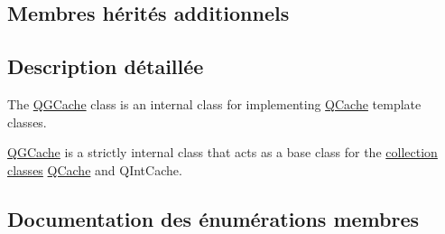 \subsection*{Membres hérités additionnels}


\subsection{Description détaillée}
The \hyperlink{class_q_g_cache}{Q\+G\+Cache} class is an internal class for implementing \hyperlink{class_q_cache}{Q\+Cache} template classes. 

\hyperlink{class_q_g_cache}{Q\+G\+Cache} is a strictly internal class that acts as a base class for the \hyperlink{}{collection classes} \hyperlink{class_q_cache}{Q\+Cache} and Q\+Int\+Cache. 

\subsection{Documentation des énumérations membres}
\hypertarget{class_q_g_cache_a1dcb303ef4795be3117374c386c5574a}{}
